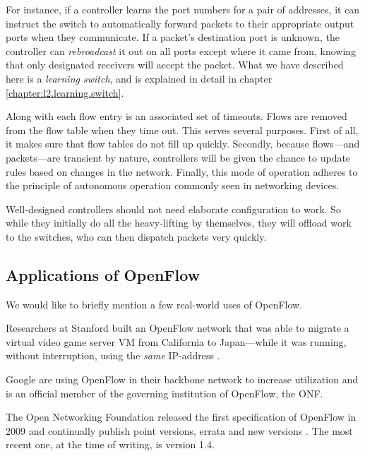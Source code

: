 For instance, if a controller learns the port numbers for a pair of
addresses, it can instruct the switch to automatically forward packets to
their appropriate output ports when they communicate.
%
If a packet's destination port is unknown, the controller can
\textit{rebroadcast} it out on all ports except where
it came from, knowing that only designated receivers will accept the packet.
%
What we have described here is a \textit{learning switch}, and is explained
in detail in chapter \vref{chapter:l2.learning.switch}.

Along with each flow entry is an associated set of timeouts.  Flows are
removed from the flow table when they time out.
%
This serves several purposes.  First of all, it makes sure that flow tables
do not fill up quickly.  Secondly, because flows---and packets---are
transient by nature, controllers will be given the chance to update rules
based on changes in the network.
%
Finally, this mode of operation adheres to the principle of autonomous
operation commonly seen in networking devices.

Well-designed controllers should not need elaborate configuration to work.
So while they initially do all the heavy-lifting by themselves, they will
offload work to the switches, who can then dispatch packets very quickly.

\subsection{Applications of OpenFlow}

We would like to briefly mention a few real-world uses of OpenFlow.

Researchers at Stanford
built an OpenFlow network that was able to migrate a virtual video game
server \ac{VM} from California to Japan---while it was running, without
interruption, using the \textit{same} IP-address
\cite{erickson2008demonstration} \cite{kobayashi2013maturing}.

Google are using OpenFlow in their backbone network to increase utilization
\cite{crabbe2012sdn} and is an official member of the governing institution
of OpenFlow, the \ac{ONF}.

The Open Networking Foundation released the first specification of OpenFlow
in 2009 and continually publish point versions, errata and new versions
\cite{openflow-1.0,openflow-1.0.1,openflow-1.0.2,openflow-1.1,openflow-1.2,openflow-1.3,openflow-1.4}.
The most recent one, at the time of writing, is version
1.4.


